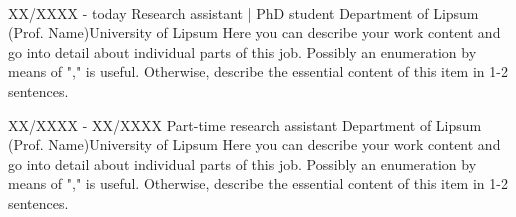 \setlength{\columnsep}{2.2em}
\setlength{\columnseprule}{4pt}
\begin{paracol}{2}

	\begin{leftcolumn}
		
	\end{leftcolumn}

	\begin{rightcolumn}


	\vspace{4pt}


	\\[4pt]



	\vspace{4pt}

	\cvtext{\Blindtext[1]




	}



	\vspace{10pt}
	\vspace{4pt}


	\cvevent
	{XX/XXXX - today}
		{Research assistant | PhD student}
		{Department of Lipsum (Prof. Name)\newline University of Lipsum}
		{Here you can describe your work content and go into detail about individual parts of this job. Possibly an enumeration by means of "," is useful. Otherwise, describe the essential content of this item in 1-2 sentences.}
		\vfill\null


	\cvevent
	{XX/XXXX - XX/XXXX}
		{Part-time research assistant}
		{Department of Lipsum (Prof. Name)\newline University of Lipsum}
		{Here you can describe your work content and go into detail about individual parts of this job. Possibly an enumeration by means of "," is useful. Otherwise, describe the essential content of this item in 1-2 sentences.}
		\vfill\null




\end{rightcolumn}
\end{paracol}
